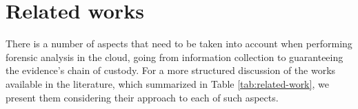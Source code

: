 \documentclass[conference]{IEEEtran}
\begin{document}


\section{Related works}
\label{sec:related}

There is a number of aspects that need to be taken into account when performing forensic analysis in the cloud, going from information collection to guaranteeing the evidence's chain of custody.
%
For a more structured discussion of the works available in the literature, which summarized in Table \ref{tab:related-work}, we present them considering their approach to each of such aspects.
\end{document}
